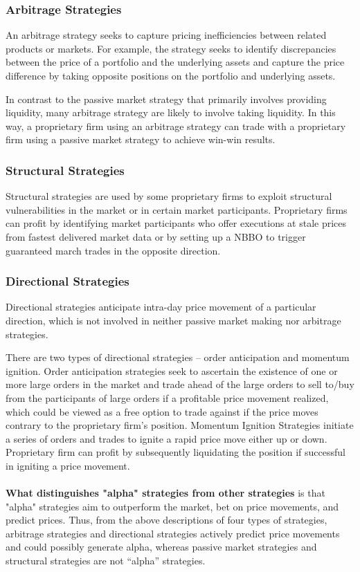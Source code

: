 \documentclass{article}
\begin{document}
\subsubsection{Arbitrage Strategies}

An arbitrage strategy seeks to capture pricing inefficiencies between related products or markets. For example, the strategy seeks to identify discrepancies between the price of a portfolio and the underlying assets and capture the price difference by taking opposite positions on the portfolio and underlying assets. 

In contrast to the passive market strategy that primarily involves providing liquidity, many arbitrage strategy are likely to involve taking liquidity. In this way, a proprietary firm using an arbitrage strategy can trade with a proprietary firm using a passive market strategy to achieve win-win results. 

\subsubsection{Structural Strategies}

Structural strategies are used by some proprietary firms to exploit structural vulnerabilities in the market or in certain market participants. Proprietary firms can profit by identifying market participants who offer executions at stale prices from fastest delivered market data or by setting up a NBBO to trigger guaranteed march trades in the opposite direction. 

\subsubsection{Directional Strategies}

Directional strategies anticipate intra-day price movement of a particular direction, which is not involved in neither passive market making nor arbitrage strategies. 

There are two types of directional strategies – order anticipation and momentum ignition. Order anticipation strategies seek to ascertain the existence of one or more large orders in the market and trade ahead of the large orders to sell to/buy from the participants of large orders if a profitable price movement realized, which could be viewed as a free option to trade against if the price moves contrary to the proprietary firm’s position. Momentum Ignition Strategies initiate a series of orders and trades to ignite a rapid price move either up or down. Proprietary firm can profit by subsequently liquidating the position if successful in igniting a price movement. 
\\
\\
\noindent \textbf{What distinguishes "alpha" strategies from other strategies} is that "alpha" strategies aim to outperform the market, bet on price movements, and predict prices. Thus, from the above descriptions of four types of strategies, arbitrage strategies and directional strategies actively predict price movements and could possibly generate alpha, whereas passive market strategies and structural strategies are not “alpha” strategies.
\end{document}
